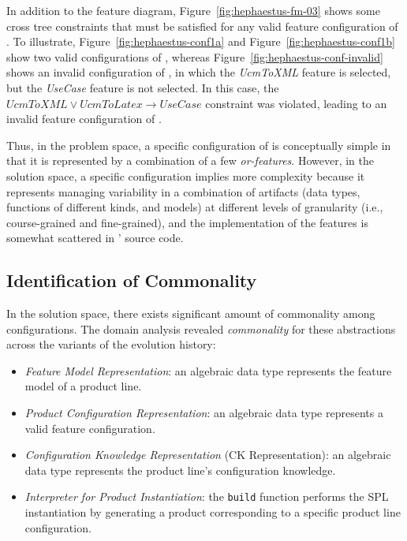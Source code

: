 
In addition to the feature diagram, Figure~\ref{fig:hephaestus-fm-03} shows some cross tree constraints that must be satisfied for any valid feature configuration of \hpl.  To illustrate, Figure~\ref{fig:hephaestus-conf1a} and Figure~\ref{fig:hephaestus-conf1b} show two valid configurations of \hpl, whereas Figure~\ref{fig:hephaestus-conf-invalid} shows an invalid configuration of \hpl, in which the \emph{UcmToXML} feature is selected, but the \emph{UseCase} feature is not selected. In this case, the $UcmToXML \lor UcmToLatex \rightarrow Use Case$ constraint was violated, leading to an invalid feature configuration of \hpl.

Thus, in the problem space, a specific configuration of \hp{} is conceptually simple in that it is represented by a combination of a few \textit{or-features}. However, in the solution space, a specific configuration implies more complexity because it represents managing variability in a combination of artifacts (data types, functions of different kinds, and models) at different levels of granularity (i.e., course-grained and fine-grained), and the implementation of the features is somewhat scattered in \hp' source code.


\subsection{Identification of Commonality} 
\label{sec:commonality}

In the solution space, there exists significant amount of commonality among configurations. 
The domain analysis revealed \emph{commonality} for these abstractions across the variants of the evolution history:

\begin{itemize}

\item \emph{Feature Model Representation}: an algebraic data type represents the feature model of a product line.
  
\item \emph{Product Configuration Representation}: an algebraic data type represents a valid feature configuration.

\item \emph{Configuration Knowledge Representation} (CK Representation): an algebraic data type represents the product line's configuration knowledge.

\item \emph{Interpreter for Product Instantiation}: the \texttt{build} function performs the SPL instantiation by generating a product corresponding to a specific product line configuration.

\end{itemize}

